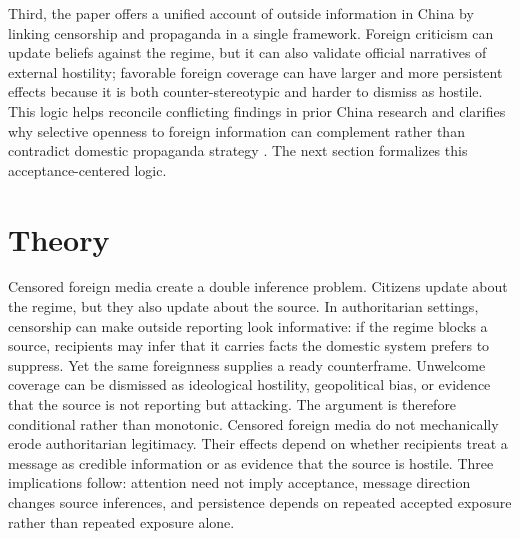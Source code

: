 \documentclass[12pt,american]{article}
\begin{document}
	Third, the paper offers a unified account of outside information in China by linking censorship and propaganda in a single framework. Foreign criticism can update beliefs against the regime, but it can also validate official narratives of external hostility; favorable foreign coverage can have larger and more persistent effects because it is both counter-stereotypic and harder to dismiss as hostile. This logic helps reconcile conflicting findings in prior China research and clarifies why selective openness to foreign information can complement rather than contradict domestic propaganda strategy \citep{chenyang2019,huang2015international,huangyeh2017,wangwestwood2024,QinStrombergWu2017,KingPanRoberts2017,GueorguievMalesky2019,huang2015signal,Huang2018}. The next section formalizes this acceptance-centered logic.
	
	
	\section*{Theory}
	
	
	
	Censored foreign media create a double inference problem. Citizens update about the regime, but they also update about the source. In authoritarian settings, censorship can make outside reporting look informative: if the regime blocks a source, recipients may infer that it carries facts the domestic system prefers to suppress. Yet the same foreignness supplies a ready counterframe. Unwelcome coverage can be dismissed as ideological hostility, geopolitical bias, or evidence that the source is not reporting but attacking. The argument is therefore conditional rather than monotonic. Censored foreign media do not mechanically erode authoritarian legitimacy. Their effects depend on whether recipients treat a message as credible information or as evidence that the source is hostile. Three implications follow: attention need not imply acceptance, message direction changes source inferences, and persistence depends on repeated accepted exposure rather than repeated exposure alone.
	
\end{document}
